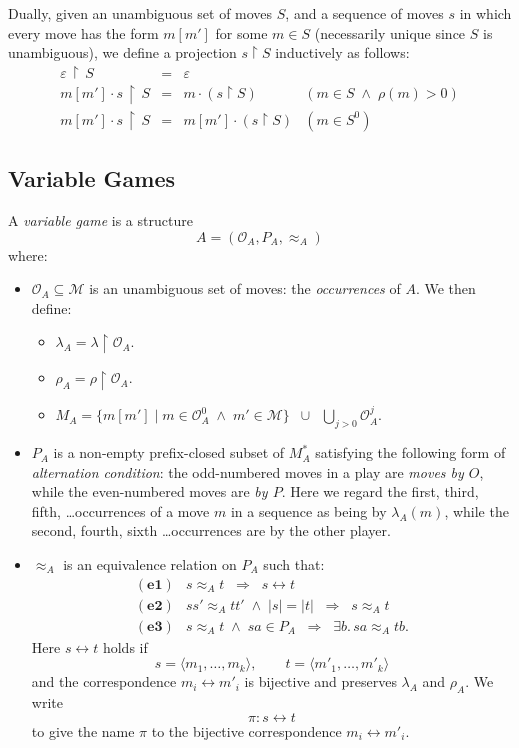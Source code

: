 \documentclass[a4paper,11pt]{article}
\newcommand{\gequiv}{\approx}
\newcommand{\restrict}{{\upharpoonright}}
\newcommand{\Occ}{\mathcal{O}}
\newcommand{\MM}{\mathcal{M}}
\begin{document}
\noindent Dually, given an unambiguous set of moves $S$, and a
sequence of moves $s$ in which every move has the form $m[m']$ for some $m \in
S$ (necessarily unique since $S$ is unambiguous), we define a
projection $s \restrict S$ inductively as follows:
\[ \begin{array}{lcll}
\varepsilon \, \restrict \, S & = & \varepsilon & \\
m[m'] \cdot s \, \restrict \, S & = & m \cdot (s \restrict S) &  (m
\in S \; \wedge \; \rho (m) >0) \\
m[m'] \cdot s \, \restrict \, S & = & m[m'] \cdot (s \restrict S) &  (m
\in S^0 )
\end{array} \]

\subsection{Variable Games}
A \emph{variable game} is a structure
\[ A = (\Occ_A,  P_A , \gequiv_A ) \]
where:
\begin{itemize}
\item
$\Occ_A \subseteq \MM$ is an unambiguous  set of moves: the
\emph{occurrences} of $A$. We then define:
\begin{itemize}
\item $\lambda_A = \lambda \restrict \Occ_A$.
\item $\rho_A = \rho \restrict \Occ_A$.
\item $M_A = \{ m[m'] \mid m \in \Occ_A^0 \; \wedge \; m' \in \MM \}
  \;\; \cup \;\; \bigcup_{j > 0} \Occ_A^j$.
\end{itemize}

\item $P_A$ is a non-empty prefix-closed subset of $M_A^{\ast}$
  satisfying the following form of \emph{alternation condition}: the
  odd-numbered moves in a play are \emph{moves by $O$}, while the
  even-numbered moves are \emph{by $P$}. Here we regard the first, third,
  fifth, \ldots occurrences of a move $m$ in a sequence as being by
  $\lambda_A (m)$, while the second, fourth, sixth \ldots occurrences
  are by the other player.


\item $\gequiv_A$ is an equivalence relation on $P_A$ such that:
\[ \begin{array}{ll}
\mathbf{(e1)} & s \gequiv_A t \;\; \Longrightarrow \;\; s
\longleftrightarrow t \\
\mathbf{(e2)} & ss' \gequiv_A tt' \; \wedge \; | s | = | t | \;\;
\Longrightarrow \;\; s \gequiv_A t \\
\mathbf{(e3)} & s \gequiv_A t \; \wedge \; sa \in P_A \;\; \Longrightarrow
\;\; \exists b. \, sa \gequiv_A tb .
\end{array} \]
Here $s \longleftrightarrow t$ holds if
\[ s = \langle m_1 , \ldots , m_k \rangle, \qquad t = \langle m'_1 ,
\ldots , m'_k \rangle \]
and the correspondence $m_i \longleftrightarrow m'_i$ is bijective and
preserves $\lambda_A$ and $\rho_A$. We
write
\[ \pi : s \longleftrightarrow t \]
to give the name $\pi$ to the bijective correspondence $m_i
\longleftrightarrow m'_i$.
\end{itemize}
\end{document}
